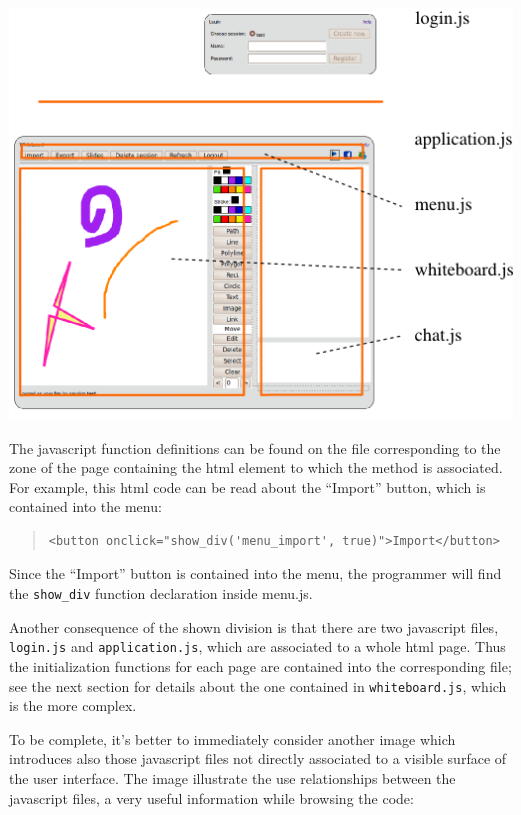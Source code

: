 \documentclass[10pt,a4paper,english]{book}
\begin{document}
\includegraphics{images/client_surface.png}

The javascript function definitions can be found on the file
corresponding to the zone of the page containing the html element to
which the method is associated. For example, this html code can be
read about the ``Import'' button, which is contained into the menu:
\begin{quote}\begin{verbatim}
<button onclick="show_div('menu_import', true)">Import</button>
\end{verbatim}
\end{quote}

Since the ``Import'' button is contained into the menu, the programmer
will find the \texttt{show{\_}div} function declaration inside menu.js.

Another consequence of the shown division is that there are two
javascript files, \texttt{login.js} and \texttt{application.js}, which are
associated to a whole html page. Thus the initialization functions for
each page are contained into the corresponding file; see the next
section for details about the one contained in \texttt{whiteboard.js},
which is the more complex.

To be complete, it's better to immediately consider another image
which introduces also those javascript files not directly associated
to a visible surface of the user interface. The image illustrate the
use relationships between the javascript files, a very useful
information while browsing the code:
\end{document}

